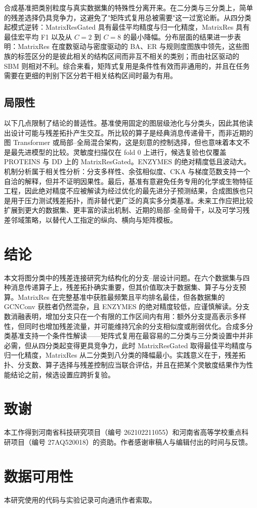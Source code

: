 \documentclass[9pt,twocolumn]{extarticle}
\begin{document}
合成基准把类别粒度与真实数据集的特殊性分离开来。在二分类与三分类上，简单的残差选择仍具竞争力，这避免了"矩阵式复用总被需要"这一过宽论断。从四分类起模式逆转：MatrixResGated 具有最佳平均精度与归一化精度，MatrixRes 具有最佳宏平均 F1 以及从 \(C=2\) 到 \(C=8\) 的最小降幅。分布层面的结果进一步表明：MatrixRes 在度数驱动与密度驱动的 BA、ER 与规则度图族中领先，这些图族的标签区分的是彼此相关的结构区间而非互不相关的类别；而由社区驱动的 SBM 则相对不利。综合来看，矩阵式复用是条件性有效而非通用的，并且在任务需要在更细的判别下区分若干相关结构区间时最为有用。

\subsection{局限性}

以下几点限制了结论的普适性。基准使用固定的图层级池化与分类头，因此其他读出设计可能与残差拓扑产生交互。所比较的算子是经典消息传递骨干，而非近期的图 Transformer 或局部--全局混合架构，这是刻意的控制选择，但也意味着本文不是最先进模型的比较。灵敏度扫描仅在 fold 0 上进行，候选复验也仅覆盖 PROTEINS 与 DD 上的 MatrixResGated。ENZYMES 的绝对精度低且波动大。机制分析属于相关性分析：分支多样性、余弦相似度、CKA 与梯度范数支持一个自洽的解释，但并不证明因果性。最后，基准有意避免任务专用的化学或生物特征工程，因此绝对精度不应被解读为经过优化的最先进分子预测结果，合成图族也只是用于压力测试残差拓扑，而非替代更广泛的真实多分类基准。未来工作应把比较扩展到更大的数据集、更丰富的读出机制、近期的局部--全局骨干，以及可学习残差邻域策略，以替代人工指定的纵向、横向与矩阵模板。

\section{结论}
\label{sec:conclusion-zh}

本文将图分类中的残差连接研究为结构化的分支--层设计问题。在六个数据集与四种消息传递算子上，残差拓扑确实重要，但其价值取决于数据集、算子与分支预算。MatrixRes 在完整基准中获胜最频繁且平均排名最佳，但各数据集的 GCNConv 获胜者仍然混杂，且 ENZYMES 的绝对精度较低，应谨慎解读。分支数消融表明，增加分支只在一个有限的工作区间内有用：额外分支提高表示多样性，但同时也增加残差流量，并可能维持冗余的分支相似度或削弱优化。合成多分类基准支持一个条件性解读——矩阵式复用在最容易的二分类与三分类设置中并非必需，但从四分类起变得更具竞争力，此时 MatrixResGated 取得最佳平均精度与归一化精度，MatrixRes 从二分类到八分类的降幅最小。实践意义在于，残差拓扑、分支数、算子选择与残差控制应当联合评估，并且在把某个灵敏度结果作为性能结论之前，候选设置应跨折复验。

\section*{致谢}

本工作得到河南省科技研究项目（编号 262102211055）和河南省高等学校重点科研项目（编号 27AQ520018）的资助。作者感谢审稿人与编辑付出的时间与反馈。

\section*{数据可用性}

本研究使用的代码与实验记录可向通讯作者索取。



\end{document}
